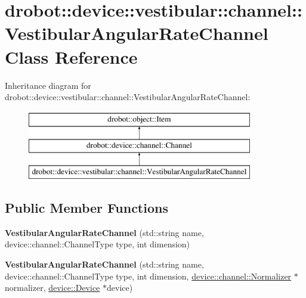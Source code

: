 \hypertarget{classdrobot_1_1device_1_1vestibular_1_1channel_1_1VestibularAngularRateChannel}{\section{drobot\-:\-:device\-:\-:vestibular\-:\-:channel\-:\-:Vestibular\-Angular\-Rate\-Channel Class Reference}
\label{classdrobot_1_1device_1_1vestibular_1_1channel_1_1VestibularAngularRateChannel}
}
Inheritance diagram for drobot\-:\-:device\-:\-:vestibular\-:\-:channel\-:\-:Vestibular\-Angular\-Rate\-Channel\-:\begin{figure}[H]
\begin{center}
\leavevmode
\includegraphics[height=3.000000cm]{classdrobot_1_1device_1_1vestibular_1_1channel_1_1VestibularAngularRateChannel}
\end{center}
\end{figure}
\subsection*{Public Member Functions}
\begin{DoxyCompactItemize}
\item 
\hypertarget{classdrobot_1_1device_1_1vestibular_1_1channel_1_1VestibularAngularRateChannel_a497e1403525ba82788ad7905575467b0}{{\bfseries Vestibular\-Angular\-Rate\-Channel} (std\-::string name, device\-::channel\-::\-Channel\-Type type, int dimension)}\label{classdrobot_1_1device_1_1vestibular_1_1channel_1_1VestibularAngularRateChannel_a497e1403525ba82788ad7905575467b0}

\item 
\hypertarget{classdrobot_1_1device_1_1vestibular_1_1channel_1_1VestibularAngularRateChannel_a0c1b3a0b6dd5c6ca2b4e97e47dba7172}{{\bfseries Vestibular\-Angular\-Rate\-Channel} (std\-::string name, device\-::channel\-::\-Channel\-Type type, int dimension, \hyperlink{classdrobot_1_1device_1_1channel_1_1Normalizer}{device\-::channel\-::\-Normalizer} $\ast$normalizer, \hyperlink{classdrobot_1_1device_1_1Device}{device\-::\-Device} $\ast$device)}\label{classdrobot_1_1device_1_1vestibular_1_1channel_1_1VestibularAngularRateChannel_a0c1b3a0b6dd5c6ca2b4e97e47dba7172}

\end{DoxyCompactItemize}
